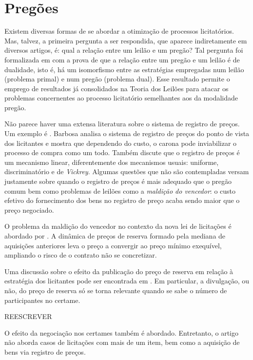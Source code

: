 \section{Pregões}

Existem diversas formas de se abordar a otimização de processos licitatórios. Mas, talvez, a primeira pergunta a ser respondida, que aparece indiretamente em diversos artigos, é: qual a relação entre um leilão e um pregão? Tal pergunta foi formalizada em \citet{deCastro2010} com a prova de que a relação entre um pregão e um leilão é de dualidade, isto é, há um isomorfismo entre as estratégias empregadas num leilão (problema primal) e num pregão (problema dual). Esse resultado permite o emprego de resultados já consolidados na Teoria dos Leilões para atacar os problemas concernentes ao processo licitatório semelhantes aos da modalidade pregão.

Não parece haver uma extensa literatura sobre o sistema de registro de preços. Um exemplo é \citet{barbosa2013}. Barbosa analisa o sistema de registro de preços do ponto de vista dos licitantes e mostra que dependendo do custo, o carona pode inviabilizar o processo de compra como um todo. Também discute que o registro de preços é um mecanismo linear, diferentemente dos mecanismos usuais: uniforme, discriminatório e de \emph{Vickrey}. Algumas questões que não são contempladas versam justamente sobre quando o registro de preços é mais adequado que o pregão comum bem como problemas de leilões como a \emph{maldição do vencedor}: o custo efetivo do fornecimento dos bens no registro de preço acaba sendo maior que o preço negociado.

O problema da maldição do vencedor no contexto da nova lei de licitações é abordado por \citet{Signor2022}. A dinâmica de preços de reserva formado pela mediana de aquisições anteriores leva o preço a convergir ao preço mínimo exequível, ampliando o risco de o contrato não se concretizar. 

Uma discussão sobre o efeito da publicação do preço de reserva em relação à estratégia dos licitantes pode ser encontrada em \citet{Bugarin2022}. Em particular, a divulgação, ou não, do preço de reserva só se torna relevante quando se sabe o número de participantes no certame.

{\huge REESCREVER}

O efeito da negociação nos certames também é abordado. Entretanto, o artigo não aborda casos de licitações com mais de um item, bem como a aquisição de bens via registro de preços.

